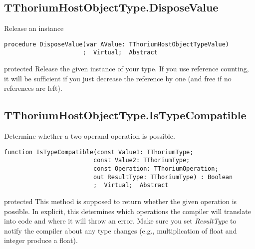 \subsection{TThoriumHostObjectType.DisposeValue}
\label{thoriumcorepkg:thorium:tthoriumhostobjecttype:disposevalue}
\begin{FPCList}
\Synopsis
Release an instance\Declaration 

\begin{verbatim}
procedure DisposeValue(var AValue: TThoriumHostObjectTypeValue)
                      ;  Virtual;  Abstract
\end{verbatim}
\Visibility
protected
\Description
Release the given instance of your type. If you use reference counting, it will be sufficient if you just decrease the reference by one (and free if no references are left).\end{FPCList}
\subsection{TThoriumHostObjectType.IsTypeCompatible}
\label{thoriumcorepkg:thorium:tthoriumhostobjecttype:istypecompatible}
\begin{FPCList}
\Synopsis
Determine whether a two-operand operation is possible.\Declaration 

\begin{verbatim}
function IsTypeCompatible(const Value1: TThoriumType;
                         const Value2: TThoriumType;
                         const Operation: TThoriumOperation;
                         out ResultType: TThoriumType) : Boolean
                         ;  Virtual;  Abstract
\end{verbatim}
\Visibility
protected
\Description
This method is supposed to return whether the given operation is possible. In explicit, this determines which operations the compiler will translate into code and where it will throw an error. Make sure you set \textit{ResultType} to notify the compiler about any type changes (e.g., multiplication of float and integer produce a float).\end{FPCList}
